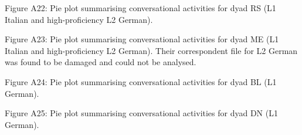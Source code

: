 \begin{stylecaption}
Figure A22: Pie plot summarising conversational activities for dyad RS (L1 Italian and high-proficiency L2 German). 
\end{stylecaption}

\begin{stylecaption}
  
 
\end{stylecaption}

\begin{stylecaption}
Figure A23: Pie plot summarising conversational activities for dyad ME (L1 Italian and high-proficiency L2 German). Their correspondent file for L2 German was found to be damaged and could not be analysed.
\end{stylecaption}

\begin{stylecaption}
  
 
\end{stylecaption}

\begin{stylecaption}
Figure A24: Pie plot summarising conversational activities for dyad BL (L1 German).
\end{stylecaption}

\begin{stylecaption}
  
 
\end{stylecaption}

\begin{stylecaption}
Figure A25: Pie plot summarising conversational activities for dyad DN (L1 German).
\end{stylecaption}

\begin{stylecaption}
  
 
\end{stylecaption}


